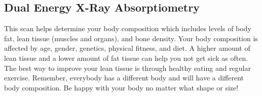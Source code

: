 \subsection{Dual Energy X-Ray Absorptiometry}

This scan helps determine your body composition which includes levels of body
fat, lean tissue (muscles and organs), and bone density. Your body composition
is affected by age, gender, genetics, physical fitness, and diet. A higher
amount of lean tissue and a lower amount of fat tissue can help you not get sick
as often. The best way to improve your lean tissue is through healthy eating and
regular exercise. Remember, everybody has a different body and will have a
different body composition. Be happy with your body no matter what shape or
size!
